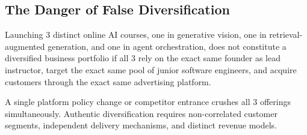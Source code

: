\subsection{The Danger of False Diversification}

Launching 3 distinct online AI courses, one in generative vision, one in retrieval-augmented generation, and one in agent orchestration, does not constitute a diversified business portfolio if all 3 rely on the exact same founder as lead instructor, target the exact same pool of junior software engineers, and acquire customers through the exact same advertising platform.

A single platform policy change or competitor entrance crushes all 3 offerings simultaneously. Authentic diversification requires non-correlated customer segments, independent delivery mechanisms, and distinct revenue models.
